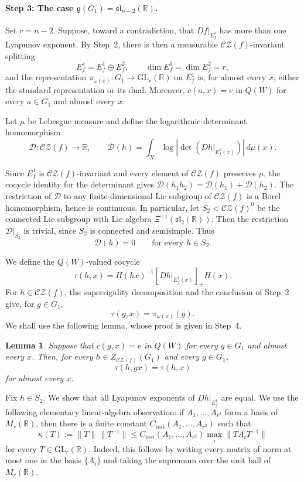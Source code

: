 \documentclass[11pt]{amsart}
\numberwithin{equation}{section}
\newcommand{\CZ}{\mathcal{CZ}}
\newcommand{\GL}{\mathrm{GL}}
\theoremstyle{plain}
\newtheorem{lem}[thm]{Lemma}
\begin{document}
 

\paragraph{\textbf{Step 3: The case
$\mathfrak g(G_1)=\mathfrak{sl}_{n-2}(\mathbb R)$.}}


Set $r=n-2$. Suppose, toward a contradiction, that
$Df|_{E_f^s}$ has more than one Lyapunov exponent. By Step~2, there is
then a measurable $\CZ(f)$-invariant splitting
\[
E_f^s=E_f^1\oplus E_f^2,\qquad
\dim E_f^1=\dim E_f^2=r,
\]
and the representation
$\pi_{\omega(x)}:G_1\to\GL_r(\mathbb R)$ on $E_f^1$ is, for almost every
$x$, either the standard representation or its dual. Moreover,
$c(a,x)=e$ in $Q(W)$ for every $a\in G_1$ and almost every $x$.


Let $\mu$ be Lebesgue measure and define the logarithmic determinant
homomorphism
\[
\mathcal D:\CZ(f)\longrightarrow\mathbb R,\qquad
\mathcal D(h)=\int_X\log\left|
\det\left(Dh|_{E_f^1(x)}\right)\right|\,d\mu(x).
\]

Since $E_f^1$ is $\CZ(f)$-invariant and every element of $\CZ(f)$
preserves $\mu$, the cocycle identity for the determinant gives
$\mathcal D(h_1h_2)=\mathcal D(h_1)+\mathcal D(h_2)$. The restriction of $\mathcal D$ to any
finite-dimensional Lie subgroup of $\CZ(f)$ is a Borel homomorphism,
hence is continuous. In particular, let $S_2<\CZ(f)^0$ be
the connected Lie subgroup with Lie algebra
$\Xi^{-1}(\mathfrak{sl}_2(\mathbb R))$.
Then the restriction $\mathcal D|_{S_2}$ is trivial, since $S_2$ is connected
and semisimple. Thus
\begin{equation}\label{eq:det-S2-zero}
\mathcal D(h)=0\qquad\text{for every }h\in S_2.
\end{equation}


We define the $Q(W)$-valued cocycle
\[
\tau(h,x)=H(hx)^{-1}[Dh|_{E_f^1(x)}]_{\pm}H(x).
\]
For $h\in \CZ(f)$, the superrigidity decomposition and the conclusion of
Step~2 give, for $g\in G_1$,
\[
\tau(g,x)=\pi_{\omega(x)}(g).
\]
We shall use the following lemma, whose proof is given in Step~4.

\begin{lem}\label{lem:tauginv}
Suppose that $c(g,x)=e$ in $Q(W)$ for every $g\in G_1$ and almost
every $x$. Then, for every $h\in Z_{\CZ(f)}(G_1)$ and every
$g\in G_1$,
\[
\tau(h,gx)=\tau(h,x)
\]
for almost every $x$.
\end{lem}

Fix $h\in S_2$. We show that all Lyapunov exponents of
$Dh|_{E_f^1}$ are equal. We use the following elementary
linear-algebra observation: if $A_1,\ldots,A_{r^2}$ form a basis of
$M_r(\mathbb R)$, then there is a finite constant
$C_{\mathrm{test}}(A_1,\ldots,A_{r^2})$ such that
\begin{equation}\label{eq:matrix-testing}
\kappa(T):=\|T\|\,\|T^{-1}\|
\le
C_{\mathrm{test}}(A_1,\ldots,A_{r^2})
\max_i\|TA_iT^{-1}\|
\end{equation}
for every $T\in\GL_r(\mathbb R)$. Indeed, this follows by writing every
matrix of norm at most one in the basis $\{A_i\}$ and taking the
supremum over the unit ball of $M_r(\mathbb R)$.
\end{document}
